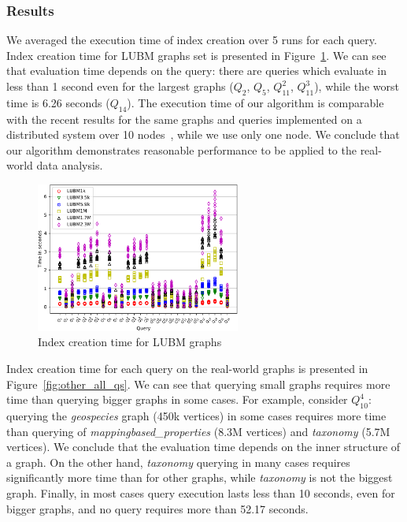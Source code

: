\subsubsection{Results}

We averaged the execution time of index creation over 5 runs for each query.
Index creation time for LUBM graphs set is presented in Figure~\ref{fig:lubm_all_qs}.
We can see that evaluation time depends on the query: there are queries which evaluate in less than 1 second even for the largest graphs ($Q_2$, $Q_5$, $Q_{11}^2$, $Q_{11}^3$), while the worst time is 6.26 seconds ($Q_{14}$).
The execution time of our algorithm is comparable with the recent results for the same graphs and queries implemented on a distributed system over 10 nodes~\citep{Wang2019}, while we use only one node.
We conclude that our algorithm demonstrates reasonable performance to be applied to the real-world data analysis.

\begin{figure}
    \centering
   \includegraphics[width=0.6\textwidth]{LUBM_all.pdf}
   \caption{Index creation time for LUBM graphs}
   \label{fig:lubm_all_qs}
\end{figure}

Index creation time for each query on the real-world graphs is presented in Figure~\ref{fig:other_all_qs}.
We can see that querying small graphs requires more time than querying bigger graphs in some cases.
For example, consider $Q_{10}^4$: querying the \textit{geospecies} graph (450k vertices) in some cases requires more time than querying of \textit{mappingbased\_properties} (8.3M vertices) and \textit{taxonomy} (5.7M vertices).
We conclude that the evaluation time depends on the inner structure of a graph.
On the other hand, \textit{taxonomy} querying in many cases requires significantly more time than for other graphs, while \textit{taxonomy} is not the biggest graph.
Finally, in most cases query execution lasts less than 10 seconds, even for bigger graphs, and no query requires more than 52.17 seconds.

